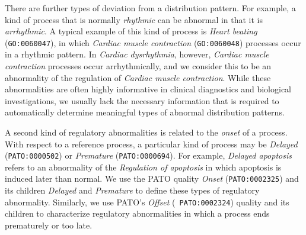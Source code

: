 \documentclass{bioinfo}
\begin{document}
There are further types of deviation from a distribution pattern. For
example, a kind of process that is normally {\em rhythmic} can be
abnormal in that it is {\em arrhythmic}. A typical example of this
kind of process is {\em Heart beating} ({\tt GO:0060047}), in which
{\em Cardiac muscle contraction} ({\tt GO:0060048}) processes occur in
a rhythmic pattern. In {\em Cardiac dysrhythmia}, however, {\em
  Cardiac muscle contraction} processes occur arrhythmically, and we
consider this to be an abnormality of the regulation of {\em Cardiac
  muscle contraction}. While these abnormalities are often highly
informative in clinical diagnostics and biological investigations, we
usually lack the necessary information that is required to
automatically determine meaningful types of abnormal distribution
patterns.

A second kind of regulatory abnormalities is related to the {\em
  onset} of a process. With respect to a reference process, a
particular kind of process may be {\em Delayed} ({\tt PATO:0000502})
or {\em Premature} ({\tt PATO:0000694}). For example, {\em Delayed
  apoptosis} refers to an abnormality of the {\em Regulation of
  apoptosis} in which apoptosis is induced later than normal.  We use
the PATO quality {\em Onset} ({\tt PATO:0002325}) and its children
{\em Delayed} and {\em Premature} to define these types of regulatory
abnormality. Similarly, we use PATO's {\em Offset} ({\tt
  PATO:0002324}) quality and its children to characterize regulatory
abnormalities in which a process ends prematurely or too late.
\end{document}
